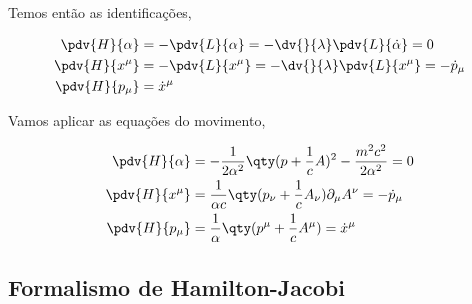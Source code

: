 \documentclass[twoside]{amsart}
\numberwithin{equation}{section}
\begin{document}
\begin{refsection}
Temos então as identificações,

\begin{align}
    \pdv{H}{\alpha}&=-\pdv{L}{\alpha}=-\dv{}{\lambda}\pdv{L}{\dot\alpha}=0\\
    \pdv{H}{x^\mu}&=-\pdv{L}{x^\mu}=-\dv{}{\lambda}\pdv{L}{x^\mu}=-\dot{p}_\mu\\
    \pdv{H}{p_\mu}&=\dot{x}^\mu
\end{align}

Vamos aplicar as equações do movimento,

\begin{align}
    \pdv{H}{\alpha}&=-\frac{1}{2\alpha^2}\qty(p+\frac1c A)^2-\frac{m^2c^2}{2\alpha^2}=0\\
    \pdv{H}{x^\mu}&=\frac{1}{\alpha c}\qty(p_\nu+\frac1c A_\nu)\partial_\mu A^\nu=-\dot{p}_\mu\\
    \pdv{H}{p_\mu}&=\frac{1}{\alpha}\qty(p^\mu+\frac1c A^\mu)=\dot{x}^\mu
\end{align}

\printbibliography[heading=subbibliography]
\end{refsection}


\begin{refsection}
\section{Formalismo de Hamilton-Jacobi}

\printbibliography[heading=subbibliography]
\end{refsection}

\end{document}
